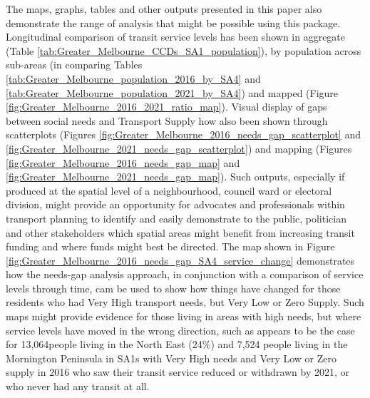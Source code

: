 \documentclass[preprint, 3p,
authoryear]{elsarticle} %
\begin{document}
The maps, graphs, tables and other outputs presented in this paper also
demonstrate the range of analysis that might be possible using this
package. Longitudinal comparison of transit service levels has been
shown in aggregate (Table
\ref{tab:Greater_Melbourne_CCDs_SA1_population}), by population across
sub-areas (in comparing Tables
\ref{tab:Greater_Melbourne_population_2016_by_SA4} and
\ref{tab:Greater_Melbourne_population_2021_by_SA4}) and mapped (Figure
\ref{fig:Greater_Melbourne_2016_2021_ratio_map}). Visual display of gaps
between social needs and Transport Supply how also been shown through
scatterplots (Figures
\ref{fig:Greater_Melbourne_2016_needs_gap_scatterplot} and
\ref{fig:Greater_Melbourne_2021_needs_gap_scatterplot}) and mapping
(Figures \ref{fig:Greater_Melbourne_2016_needs_gap_map} and
\ref{fig:Greater_Melbourne_2021_needs_gap_map}). Such outputs,
especially if produced at the spatial level of a neighbourhood, council
ward or electoral division, might provide an opportunity for advocates
and professionals within transport planning to identify and easily
demonstrate to the public, politician and other stakeholders which
spatial areas might benefit from increasing transit funding and where
funds might best be directed. The map shown in Figure
\ref{fig:Greater_Melbourne_2016_needs_gap_SA4_service_change}
demonstrates how the needs-gap analysis approach, in conjunction with a
comparison of service levels through time, cam be used to show how
things have changed for those residents who had Very High transport
needs, but Very Low or Zero Supply. Such maps might provide evidence for
those living in areas with high needs, but where service levels have
moved in the wrong direction, such as appears to be the case for
13,064people living in the North East (24\%) and 7,524 people living in
the Mornington Peninsula in SA1s with Very High needs and Very Low or
Zero supply in 2016 who saw their transit service reduced or withdrawn
by 2021, or who never had any transit at all.
\end{document}
